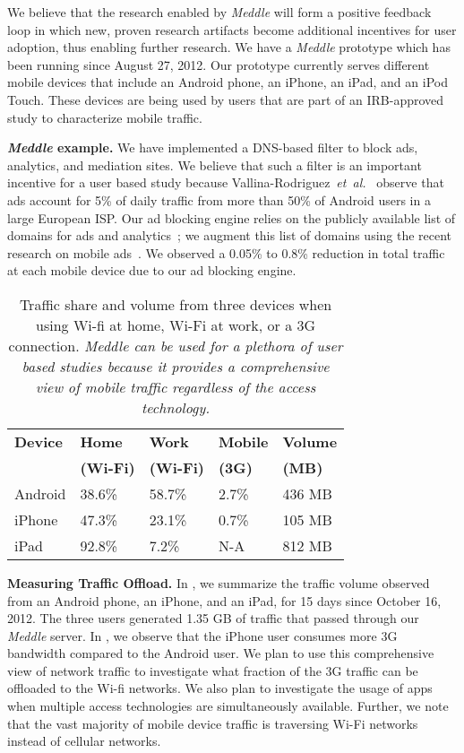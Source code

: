 \documentclass{sig-alternate}
\newcommand{\etal}{\emph{et~al.}}
\newcommand{\meddle}{{\em Meddle}\xspace}
\renewcommand{\fref}{\Fref}
\begin{document}
We believe that the research enabled by \meddle will form a positive
feedback loop in which new, proven research artifacts become
additional incentives for user adoption, thus enabling further
research. We have a \meddle prototype which has been running
since August 27, 2012. Our prototype currently serves different mobile
devices that include an Android phone, an iPhone, an iPad, and an iPod 
Touch. These devices are being used by users that are part of an
IRB-approved study to characterize mobile traffic.

\textbf{\meddle example.} We have implemented a DNS-based filter to
block ads, analytics, and mediation sites. We believe that such a filter is
an important incentive for a user based study because
Vallina-Rodriguez~\etal~\cite{Vallina-rodriguez:2012:AdCache} observe
that ads account for 5\% of daily traffic from more than 50\% of
Android users in a large European ISP. Our ad blocking engine relies
on the publicly available list of domains for ads and
analytics~\cite{YoyoAds}; we augment this list of domains using the
recent research on mobile ads~\cite{hornyack:appfence,
  Leontiadis:2012:AdsMobile}. We observed a 0.05\% to 0.8\% reduction
in total traffic at each mobile device due to our ad blocking engine.

\begin{table}
\centering
\begin{small}
\begin{tabular}{|l|l|l|l|l|}
\hline
{\bf Device} & {\bf Home} & {\bf Work} & {\bf Mobile} & {\bf Volume}\\
    & {\bf (Wi-Fi)} & {\bf (Wi-Fi)} & {\bf (3G)} & {\bf (MB)}\\
\hline
Android & 38.6\% & 58.7\% & 2.7\%  & 436 MB\\
\hline
iPhone & 47.3\% & 23.1\% & 0.7\%  & 105 MB\\
\hline
iPad & 92.8\% & 7.2\% & N-A  & 812 MB\\
\hline

\end{tabular}
\end{small}
\caption{Traffic share and volume from three devices when using Wi-fi at
  home, Wi-Fi at work, or a 3G connection. \emph{\meddle can be used
    for a plethora of user based studies because it provides a
    comprehensive view of mobile traffic regardless of the access
    technology.}} 
\label{tab:Usage}
\end{table}

\textbf{Measuring Traffic Offload.} In \fref{tab:Usage}, we summarize
the traffic volume observed from an Android phone, an
iPhone, and an iPad, for 15 days since October 16, 2012. The three users
generated 1.35 GB of traffic that passed through our \meddle
server. In \fref{tab:Usage}, we observe that the iPhone user consumes
more 3G bandwidth compared to the Android user. We plan to use this
comprehensive view of network traffic to investigate what fraction of
the 3G traffic can be offloaded to the Wi-fi networks. We also plan to
investigate the usage of apps when multiple access technologies are
simultaneously available. Further, we note that the vast majority of
mobile device traffic is traversing Wi-Fi networks instead of cellular
networks. 
\end{document}
